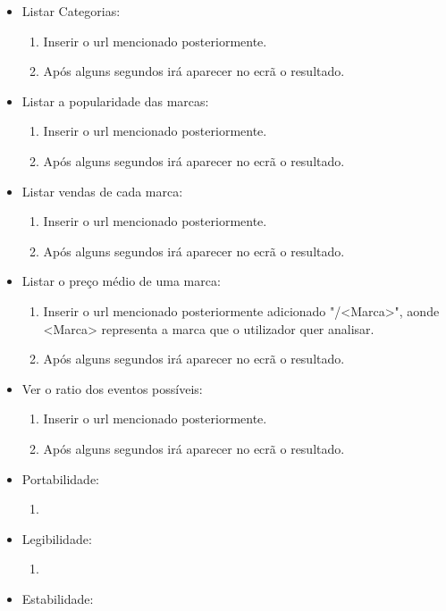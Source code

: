 \documentclass[11pt,a4paper]{article}
\begin{document}
\begin{itemize}
	\item Listar Categorias:
	\begin{enumerate}
		\item Inserir o url mencionado posteriormente.
		\item Após alguns segundos irá aparecer no ecrã o resultado.
	\end{enumerate}
	\item Listar a popularidade das marcas:
	\begin{enumerate}
		\item Inserir o url mencionado posteriormente.
		\item Após alguns segundos irá aparecer no ecrã o resultado.
	\end{enumerate}
	\item Listar vendas de cada marca:
	\begin{enumerate}
		\item Inserir o url mencionado posteriormente.
		\item Após alguns segundos irá aparecer no ecrã o resultado.
	\end{enumerate}
	\item Listar o preço médio de uma marca:
	\begin{enumerate}
		\item Inserir o url mencionado posteriormente adicionado "/<Marca>", aonde <Marca> representa a marca que o utilizador quer analisar.
		\item Após alguns segundos irá aparecer no ecrã o resultado.
	\end{enumerate}
	\item Ver o ratio dos eventos possíveis:
	\begin{enumerate}
		\item Inserir o url mencionado posteriormente.
		\item Após alguns segundos irá aparecer no ecrã o resultado.
	\end{enumerate}
	\item Portabilidade:
	\begin{enumerate}
		\item 
	\end{enumerate}
	\item Legibilidade:
	\begin{enumerate}
		\item 
	\end{enumerate}
	\item Estabilidade:
	\begin{enumerate}

\end{enumerate}
\end{itemize}
\end{document}
